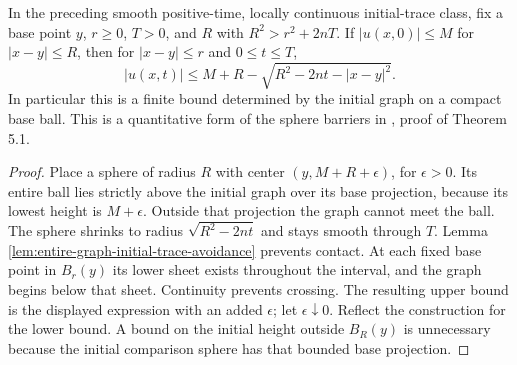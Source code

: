 \begin{proposition}\label{prop:entire-graph-local-height-barrier}
In the preceding smooth positive-time, locally continuous initial-trace class, fix a base point $y$, $r\geq0$, $T>0$, and $R$ with $R^2>r^2+2nT$. If $|u(x,0)|\leq M$ for $|x-y|\leq R$, then for $|x-y|\leq r$ and $0\leq t\leq T$,
\[
 |u(x,t)|\leq M+R-\sqrt{R^2-2nt-|x-y|^2}.
\]
In particular this is a finite bound determined by the initial graph on a compact base ball. This is a quantitative form of the sphere barriers in \cite{EH91}, proof of Theorem 5.1.
\end{proposition}
\begin{proof}
Place a sphere of radius $R$ with center $(y,M+R+\epsilon)$, for $\epsilon>0$. Its entire ball lies strictly above the initial graph over its base projection, because its lowest height is $M+\epsilon$. Outside that projection the graph cannot meet the ball. The sphere shrinks to radius $\sqrt{R^2-2nt}$ and stays smooth through $T$. Lemma \ref{lem:entire-graph-initial-trace-avoidance} prevents contact. At each fixed base point in $B_r(y)$ its lower sheet exists throughout the interval, and the graph begins below that sheet. Continuity prevents crossing. The resulting upper bound is the displayed expression with an added $\epsilon$; let $\epsilon\downarrow0$. Reflect the construction for the lower bound. A bound on the initial height outside $B_R(y)$ is unnecessary because the initial comparison sphere has that bounded base projection.
\end{proof}

